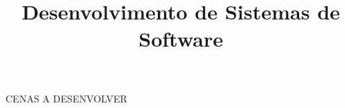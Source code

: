 \documentclass{article}
\title {Desenvolvimento de Sistemas de Software}
\begin{document}
    
CENAS A DESENVOLVER











\end{document}

